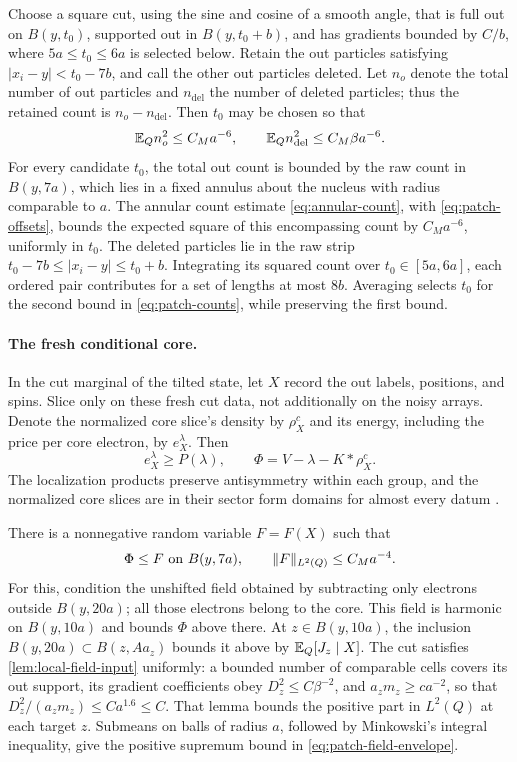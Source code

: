 Choose a square cut, using the sine and cosine of a
smooth angle, that is full out on $B(y,t_0)$, supported out in
$B(y,t_0+b)$, and has gradients bounded by $C/b$, where
$5a\leq t_0\leq6a$ is selected below.  Retain the out particles satisfying
$|x_i-y|<t_0-7b$, and call the other out particles deleted.
Let $n_o$ denote the total number of out particles and
$n_{\mathrm{del}}$ the number of deleted particles; thus the retained
count is $n_o-n_{\mathrm{del}}$.  Then $t_0$ may be chosen so that
\begin{equation}
 \mathbb E_Q n_o^2\leq C_Ma^{-6},\qquad
 \mathbb E_Q n_{\mathrm{del}}^2\leq C_M\beta a^{-6}.
 \label{eq:patch-counts}
\end{equation}
For every candidate $t_0$, the total out count is bounded by the raw
count in $B(y,7a)$, which lies in a fixed annulus about the nucleus
with radius comparable to $a$.  The annular count estimate
\cref{eq:annular-count}, with \cref{eq:patch-offsets}, bounds the
expected square of this encompassing count by $C_Ma^{-6}$, uniformly
in $t_0$.  The deleted particles lie in the raw strip
$t_0-7b\leq|x_i-y|\leq t_0+b$.
Integrating its squared count over $t_0\in[5a,6a]$, each ordered pair
contributes for a set of lengths at most $8b$.  Averaging selects $t_0$
for the second bound in \cref{eq:patch-counts}, while preserving the
first bound.

\paragraph{The fresh conditional core.}
In the cut marginal of the tilted state, let $X$ record the out labels,
positions, and spins.  Slice only on these fresh cut data, not additionally
on the noisy arrays.  Denote the normalized core slice's density by
$\rho_X^c$ and its energy, including the price per core electron, by
$e_X^\lambda$.  Then
\[
 e_X^\lambda\geq P(\lambda),\qquad
 \Phi=V-\lambda-K*\rho_X^c.
\]
The localization products preserve antisymmetry within each group, and
the normalized core slices are in their sector form domains for almost
every datum \cite[\FLocalization]{Foundation}.

There is a nonnegative random variable $F=F(X)$ such that
\begin{equation}
 \Phi\leq F\text{ on }B(y,7a),\qquad
 \lVert F\rVert_{L^2(Q)}\leq C_Ma^{-4}.
 \label{eq:patch-field-envelope}
\end{equation}
For this, condition the unshifted field obtained by subtracting only
electrons outside $B(y,20a)$; all those electrons belong to the core.
This field is harmonic on $B(y,10a)$ and bounds $\Phi$ above there.
At $z\in B(y,10a)$, the inclusion
$B(y,20a)\subset B(z,Aa_z)$ bounds it above by
$\mathbb E_Q[J_z\mid X]$.
The cut satisfies \cref{lem:local-field-input} uniformly: a bounded
number of comparable cells covers its out support, its gradient
coefficients obey $D_z^2\leq C\beta^{-2}$, and
$a_zm_z\geq ca^{-2}$, so that $D_z^2/(a_zm_z)\leq Ca^{1.6}\leq C$.
That lemma bounds the positive part in $L^2(Q)$ at each target $z$.
Submeans on balls of radius $a$, followed by Minkowski's integral
inequality, give the positive supremum bound in
\cref{eq:patch-field-envelope}.

